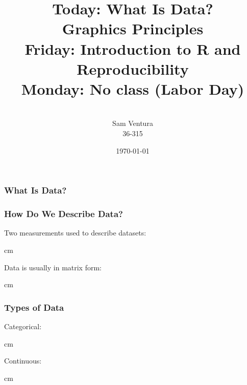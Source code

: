 \documentclass{beamer} %
\begin{document}
\title[dedup]{Today:  What Is Data?\\Graphics Principles\\Friday:  Introduction to R and Reproducibility\\Monday:  No class (Labor Day)}


\author[Samuel L. Ventura]{\\
  \large{Sam Ventura\\36-315}}
\date{\today}


\begin{frame}
	\maketitle
	
\end{frame}



\begin{frame}\frametitle{What Is Data?}
	\centering
	
\end{frame}


\begin{frame}\frametitle{How Do We Describe Data?}
	Two measurements used to describe datasets:
	
	 cm
	
	Data is usually in matrix form:
	
	 cm
	
\end{frame}


\begin{frame}\frametitle{Types of Data}
	
	Categorical:
	
	 cm
	
	Continuous:
	
	 cm
	
\end{frame}
\end{document}
